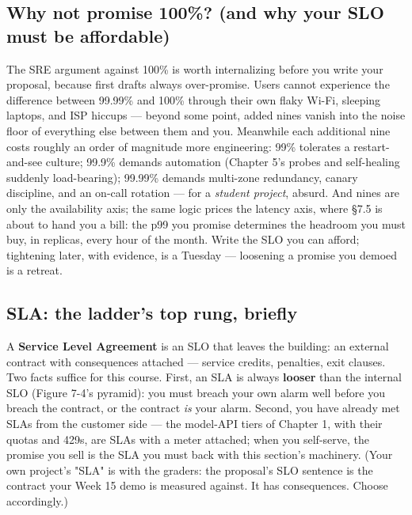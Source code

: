 \subsection*{Why not promise 100\%? (and why your SLO must be affordable)}

The SRE argument against 100\% is worth internalizing before you write your proposal, because first drafts always over-promise. Users cannot experience the difference between 99.99\% and 100\% through their own flaky Wi-Fi, sleeping laptops, and ISP hiccups — beyond some point, added nines vanish into the noise floor of everything else between them and you. Meanwhile each additional nine costs roughly an order of magnitude more engineering: 99\% tolerates a restart-and-see culture; 99.9\% demands automation (Chapter 5's probes and self-healing suddenly load-bearing); 99.99\% demands multi-zone redundancy, canary discipline, and an on-call rotation — for a \textit{student project}, absurd. And nines are only the availability axis; the same logic prices the latency axis, where §7.5 is about to hand you a bill: the p99 you promise determines the headroom you must buy, in replicas, every hour of the month. Write the SLO you can afford; tightening later, with evidence, is a Tuesday — loosening a promise you demoed is a retreat.

\subsection*{SLA: the ladder's top rung, briefly}

A \textbf{Service Level Agreement} is an SLO that leaves the building: an external contract with consequences attached — service credits, penalties, exit clauses. Two facts suffice for this course. First, an SLA is always \textbf{looser} than the internal SLO (Figure 7-4's pyramid): you must breach your own alarm well before you breach the contract, or the contract \textit{is} your alarm. Second, you have already met SLAs from the customer side — the model-API tiers of Chapter 1, with their quotas and 429s, are SLAs with a meter attached; when you self-serve, the promise you sell is the SLA you must back with this section's machinery. (Your own project's "SLA" is with the graders: the proposal's SLO sentence is the contract your Week 15 demo is measured against. It has consequences. Choose accordingly.)

